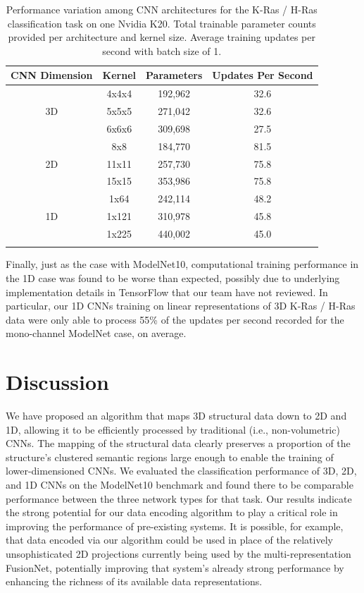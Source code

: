 \documentclass{article}
\begin{document}
\begin{table}[H]
\centering
\begin{tabular}[t]{cccc}
\toprule
CNN Dimension & Kernel & Parameters & Updates Per Second \\
\midrule
 & 4x4x4 & 192,962 & 32.6 \\

3D & 5x5x5 & 271,042 & 32.6 \\

 & 6x6x6 & 309,698  & 27.5 \\
\midrule
 & 8x8 & 184,770 & 81.5 \\

2D & 11x11 & 257,730 & 75.8 \\

 & 15x15 & 353,986 & 75.8 \\
\midrule
 & 1x64 & 242,114 & 48.2 \\

1D & 1x121 & 310,978 & 45.8 \\

 & 1x225 & 440,002 & 45.0 \\
\bottomrule \\
\end{tabular}
\caption{Performance variation among CNN architectures for the K-Ras / H-Ras classification task on one Nvidia K20. Total trainable parameter counts provided per architecture and kernel size. Average training updates per second with batch size of 1.}
\label{table:5}
\end{table}

Finally, just as the case with ModelNet10, computational training performance in the 1D case was found to be worse than expected, possibly due to underlying implementation details in TensorFlow that our team have not reviewed. In particular, our 1D CNNs training on linear representations of 3D K-Ras / H-Ras data were only able to process 55\% of the updates per second recorded for the mono-channel ModelNet case, on average.

\section{Discussion}

We have proposed an algorithm that maps 3D structural data down to 2D and 1D, allowing it to be efficiently processed by traditional (i.e., non-volumetric) CNNs. The mapping of the structural data clearly preserves a proportion of the structure's clustered semantic regions large enough to enable the training of lower-dimensioned CNNs. We evaluated the classification performance of 3D, 2D, and 1D CNNs on the ModelNet10 benchmark and found there to be comparable performance between the three network types for that task. Our results indicate the strong potential for our data encoding algorithm to play a critical role in improving the performance of pre-existing systems. It is possible, for example, that data encoded via our algorithm could be used in place of the relatively unsophisticated 2D projections currently being used by the multi-representation FusionNet, potentially improving that system's already strong performance by enhancing the richness of its available data representations.
\end{document}

